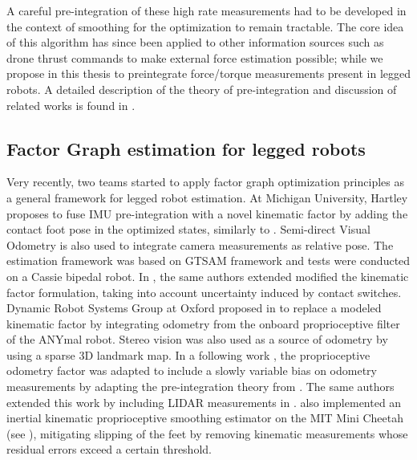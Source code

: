 A careful pre-integration \cite{lupton-09,forster2017-TRO} of these high 
rate measurements had to be developed in the context of smoothing for the optimization to remain tractable. The core idea of this algorithm has 
since been applied to other information sources such as drone thrust commands \cite{nisar2019vimo} to make external force estimation possible; 
while we propose in this thesis to preintegrate force/torque measurements present in legged robots.
A detailed description of the theory of pre-integration and discussion of related works is found in .


\subsection{Factor Graph estimation for legged robots}
Very recently, two teams started to apply factor graph optimization principles as a general framework for legged robot estimation. At Michigan University, Hartley \cite{hartley2018legged} 
proposes to fuse IMU pre-integration with a novel kinematic factor by adding the contact foot pose in the optimized states, similarly to \cite{bloesch2013state,rotella2014state}. 
Semi-direct Visual Odometry \cite{forster2014svo} is also used to integrate camera measurements as relative pose. The estimation framework was based on GTSAM framework \cite{dellaert2012factor}
and tests were conducted on a Cassie bipedal robot. In \cite{hartley2018hybrid}, the same authors extended 
modified the kinematic factor formulation, taking into account uncertainty induced by contact switches. Dynamic Robot Systems Group at Oxford proposed in 
\cite{wisth2019robust} to replace a modeled kinematic factor by integrating odometry from the onboard proprioceptive filter of the ANYmal robot. Stereo vision was 
also used as a source of odometry by using a sparse 3D landmark map. In a following work \cite{wisth2020preintegrated}, the proprioceptive odometry factor was adapted
to include a slowly variable bias on odometry measurements by adapting the pre-integration theory from \cite{forster2017-TRO}. The same authors extended this work
by including LIDAR measurements in \cite{wisth2021vilens}.
\cite{kim2021legged} also implemented an inertial kinematic proprioceptive smoothing estimator on the MIT Mini Cheetah (see ), mitigating slipping of the feet by removing kinematic 
measurements whose residual errors exceed a certain threshold.    


